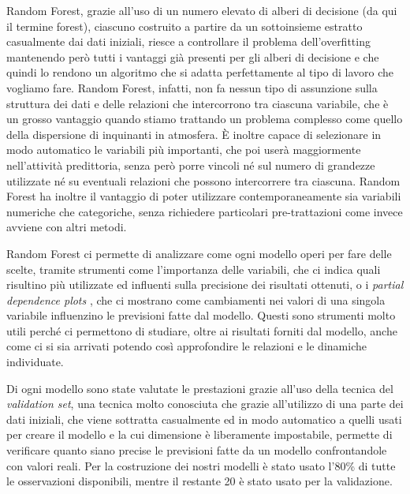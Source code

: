 Random Forest, grazie all'uso di un numero elevato di alberi di decisione (da qui il termine forest), ciascuno costruito a partire da un sottoinsieme estratto casualmente dai dati iniziali, riesce a controllare il problema dell'overfitting mantenendo però tutti i vantaggi già presenti per gli alberi di decisione e che quindi lo rendono un algoritmo che si adatta perfettamente al tipo di lavoro che vogliamo fare. Random Forest, infatti, non fa nessun tipo di assunzione sulla struttura dei dati e delle relazioni che intercorrono tra ciascuna variabile, che è un grosso vantaggio quando stiamo trattando un problema complesso come quello della dispersione di inquinanti in atmosfera. È inoltre capace di selezionare in modo automatico le variabili più importanti, che poi userà maggiormente nell'attività predittoria, senza però porre vincoli né sul numero di grandezze utilizzate né su eventuali relazioni che possono intercorrere tra ciascuna. Random Forest ha inoltre il vantaggio di poter utilizzare contemporaneamente sia variabili numeriche che categoriche, senza richiedere particolari pre-trattazioni come invece avviene con altri metodi. 

Random Forest ci permette di analizzare come ogni modello operi per fare delle scelte, tramite strumenti come l'importanza delle variabili, che ci indica quali risultino più utilizzate ed influenti sulla precisione dei risultati ottenuti, o i \textit{partial dependence plots}
, che ci mostrano come cambiamenti nei valori di una singola variabile influenzino le previsioni fatte dal modello. Questi sono strumenti molto utili perché ci permettono di studiare, oltre ai risultati forniti dal modello, anche come ci si sia arrivati potendo così approfondire le relazioni e le dinamiche individuate.

Di ogni modello sono state valutate le prestazioni grazie all'uso della tecnica del \textit{validation set}, una tecnica molto conosciuta che grazie all'utilizzo di una parte dei dati iniziali, che viene sottratta casualmente ed in modo automatico a quelli usati per creare il modello e la cui dimensione è liberamente impostabile, permette di verificare quanto siano precise le previsioni fatte da un modello confrontandole con valori reali. Per la costruzione dei nostri modelli è stato usato l'80\% di tutte le osservazioni disponibili, mentre il restante 20 è stato usato per la validazione.

